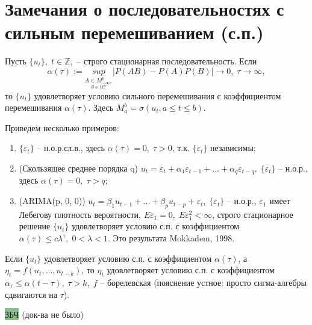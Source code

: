 \section{Замечания о последовательностях с сильным перемешиванием (с.п.)}\label{lec:13/sec:1}
\begin{definition}
    Пусть $\lbrace u_t \rbrace, \; t \in \mathbb{Z}, $ -- строго стационарная последовательность. Если
    $$\alpha(\tau) := \underset{\underset{B \in M_{\tau}^{\infty}}{A \in M_{-\infty}^0,}}{sup}|P(AB) - P(A)P(B)| \rightarrow 0, \; \tau \rightarrow \infty,$$
    то $\lbrace u_t \rbrace$ удовлетворяет условию сильного перемешивания с коэффициентом перемешивания $\alpha(\tau)$. Здесь $M_a^b = \sigma(u_t, a \leq t \leq b).$
\end{definition}
\begin{example}\label{Mokkadem}
    Приведем несколько примеров:
    \begin{enumerate}
        \item $\lbrace \varepsilon_t \rbrace$ -- н.о.р.сл.в., здесь $\alpha(\tau) = 0, \; \tau > 0$, т.к. $\lbrace \varepsilon_t \rbrace$ независимы;
        \item (Скользящее среднее порядка q) $u_t = \varepsilon_t + \alpha_1 \varepsilon_{t - 1} + \ldots + \alpha_q \varepsilon_{t - q}, \; \lbrace \varepsilon_t \rbrace$ -- н.о.р., здесь $\alpha(\tau) = 0, \; \tau > q $;
        \item (ARIMA(p, 0, 0)) $u_t = \beta_1 u_{t - 1} + \ldots + \beta_p u_{t - p} + \varepsilon_t, \; \lbrace \varepsilon_t \rbrace$ -- н.о.р., $\varepsilon_1$ имеет Лебегову плотность вероятности, $E\varepsilon_1 = 0, \; E\varepsilon_1^2 < \infty$, строго стационарное решение $\lbrace u_t \rbrace$ удовлетворяет условию с.п. с коэффициентом $\alpha(\tau) \leq c\lambda^{\tau}, \; 0 < \lambda < 1.$ Это результата Mokkadem, 1998.
    \end{enumerate} 
\end{example}

\begin{problem}
    Если $\lbrace u_t \rbrace$ удовлетворяет условию с.п. с коэффициентом $\alpha(\tau)$, а $\eta_t = f(u_t, \ldots, u_{t - k})$, то $\eta_t$ удовлетворяет условию с.п. с коэффициентом $\alpha_{\tau} \leq \alpha(t - \tau), \; \tau > k, \; f$ -- борелевская (пояснение устное: просто сигма-алгебры сдвигаются на $\tau$).
\end{problem}\newpage

\colorbox{DarkSeaGreen}{ЗБЧ} (док-ва не было)

